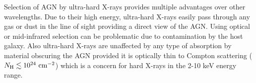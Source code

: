 Selection of AGN by ultra-hard X-rays provides multiple advantages over other wavelengths. Due to their high energy, ultra-hard X-rays easily pass through any gas or dust in the line of sight providing a direct view of the AGN. Using optical or mid-infrared selection can be problematic due to contamination by the host galaxy. Also ultra-hard X-rays are unaffected by any type of absorption by material obscuring the AGN provided it is optically thin to Compton scattering ($N_{\rm{H}} \lesssim 10^{24}\,\, \rm{cm}^{-2}$) which is a concern for hard X-rays in the 2-10 keV energy range.